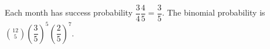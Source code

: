 Each month has success probability $\dfrac{3}{4}\dfrac{4}{5}=\dfrac{3}{5}$. The binomial probability is $\boxed{\binom{12}{5}(\dfrac{3}{5})^5(\dfrac{2}{5})^7}$.
